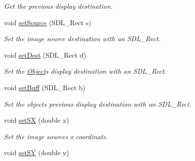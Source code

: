 \begin{DoxyCompactItemize}
\begin{DoxyCompactList}\small\item\em Get the previous display destination. \end{DoxyCompactList}\item 
void \hyperlink{classObject_ab53b92a384c274bc1805eb50617d5117}{set\+Source} (S\+D\+L\+\_\+\+Rect s)\hypertarget{classObject_ab53b92a384c274bc1805eb50617d5117}{}\label{classObject_ab53b92a384c274bc1805eb50617d5117}

\begin{DoxyCompactList}\small\item\em Set the image source destination with an S\+D\+L\+\_\+\+Rect. \end{DoxyCompactList}\item 
void \hyperlink{classObject_a0edcf4141d5f6b86337597ecac4f8df2}{set\+Dest} (S\+D\+L\+\_\+\+Rect d)\hypertarget{classObject_a0edcf4141d5f6b86337597ecac4f8df2}{}\label{classObject_a0edcf4141d5f6b86337597ecac4f8df2}

\begin{DoxyCompactList}\small\item\em Set the \hyperlink{classObject}{Object}\textquotesingle{}s display destination with an S\+D\+L\+\_\+\+Rect. \end{DoxyCompactList}\item 
void \hyperlink{classObject_aa4a5d9d35931d9a0ad47557c3ca23ac7}{set\+Buff} (S\+D\+L\+\_\+\+Rect b)\hypertarget{classObject_aa4a5d9d35931d9a0ad47557c3ca23ac7}{}\label{classObject_aa4a5d9d35931d9a0ad47557c3ca23ac7}

\begin{DoxyCompactList}\small\item\em Set the object\textquotesingle{}s previous display destination with an S\+D\+L\+\_\+\+Rect. \end{DoxyCompactList}\item 
void \hyperlink{classObject_a63266f7fbaade4768bf6d60d0b313508}{set\+SX} (double x)\hypertarget{classObject_a63266f7fbaade4768bf6d60d0b313508}{}\label{classObject_a63266f7fbaade4768bf6d60d0b313508}

\begin{DoxyCompactList}\small\item\em Set the image sources x coordinate. \end{DoxyCompactList}\item 
void \hyperlink{classObject_a48c2da85369813e9bf1eb71eee579e8f}{set\+SY} (double y)\hypertarget{classObject_a48c2da85369813e9bf1eb71eee579e8f}{}\label{classObject_a48c2da85369813e9bf1eb71eee579e8f}


\end{DoxyCompactItemize}
